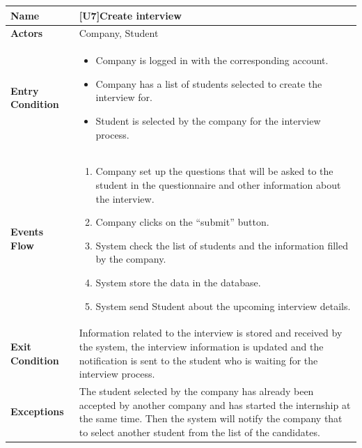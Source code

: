 \begin{center}
    \begin{tabular}{|p{9em}|p{27em}|}
        \hline
        \rowcolor{bluepoli!40} %
        \textbf{Name} & \textbf{[U7]Create interview} \\
        \hline
        \textbf{Actors} & Company, Student \\
        \hline
        \textbf{Entry Condition} & 
        \begin{itemize}
            \item Company is logged in with the corresponding account.
            \item Company has a list of students selected to create the interview for.
            \item Student is selected by the company for the interview process.
        \end{itemize} \\
        \hline
        \textbf{Events Flow} & 
        \begin{enumerate}
            \item Company set up the questions that will be asked to the student in the questionnaire and other information about the interview.
            \item Company clicks on the ``submit'' button.
            \item System check the list of students and the information filled by the company.
            \item System store the data in the database.
            \item System send Student about the upcoming interview details.
        \end{enumerate} \\
        \hline
        \textbf{Exit Condition} & 
        Information related to the interview is stored and received by the system, the interview information is updated and the notification is 
        sent to the student who is waiting for the interview process.\\
        \hline
        \textbf{Exceptions} &
        The student selected by the company has already been accepted by another company and has started the internship at the same time.
        Then the system will notify the company that to select another student from the list of the candidates.\\
        \hline
    \end{tabular}
\end{center}

